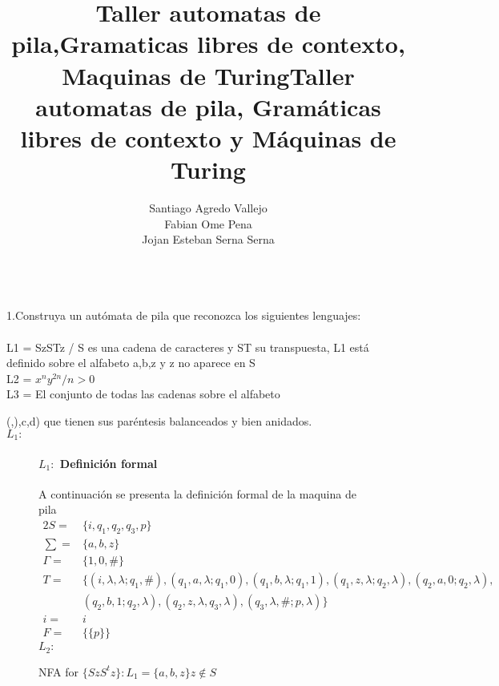 \documentclass[10pt,a4paper]{book}
\date{}
\title{\Huge Taller automatas de pila,Gramaticas libres de contexto, Maquinas de Turing}
\author{Santiago Agredo Vallejo\\Fabian Ome Pena\\Jojan Esteban Serna Serna}
\begin{document}
	\maketitle
	\title{\huge Taller automatas de pila, Gramáticas libres de contexto y Máquinas de Turing}\\[2cm]
	1.Construya un autómata de pila que reconozca los siguientes lenguajes:\\ \\
	L1 = { SzSTz / S es una cadena de caracteres y ST su transpuesta},  L1 está definido sobre el alfabeto {a,b,z} y z no aparece en S\\
	L2 = ${ x^ny^{2n} / n>0}$\\
	L3 = El conjunto de todas las cadenas sobre el alfabeto {(,),c,d) que tienen sus paréntesis balanceados y bien anidados.\\
	\textbf{$L_1:$}
		\begin{figure*}[ht]
		\caption{NFA for $\{SzS^tz \} : L_1 = \{a,b,z\} z \notin S$}
\paragraph{$L_1:$ Definición formal}A continuación se presenta la definición formal de la maquina de pila\\[0.2cm]
\begin{alignat*}{2}
	S=& \{i, q_1, q_2, q_3, p\}\\
	\textstyle \sum=& \{a, b, z\}\\
	\Gamma=&\{1,0,\#\}\\
	T=&\{(i,\lambda,\lambda;q_1,\#),(q_1,a,\lambda;q_1,0),(q_1,b,\lambda;q_1,1),(q_1,z,\lambda;q_2,\lambda) ,(q_2,a,0;q_2,\lambda),\\&(q_2,b,1;q_2,\lambda),(q_2,z,\lambda,q_3,\lambda),(q_3,\lambda,\#;p,\lambda)    \}\\
	i=&i\\
	F=&\{\{p\}\}
\end{alignat*}
\newpage
\textbf{$L_2:$}
	\end{figure*}

}
\end{document}
